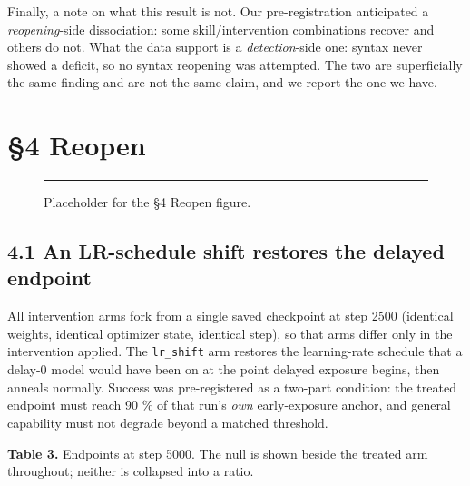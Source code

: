 \documentclass[11pt]{article}
\begin{document}
Finally, a note on what this result is not. Our pre-registration anticipated a
\emph{reopening}-side dissociation: some skill/intervention combinations recover and others do
not. What the data support is a \emph{detection}-side one: syntax never showed a deficit, so no
syntax reopening was attempted. The two are superficially the same finding and are not the
same claim, and we report the one we have.

\section{§4 Reopen}\label{reopen}

\begin{figure}[t]
\centering
\rule{\linewidth}{36.00\baselineskip}
\caption{Placeholder for the §4 Reopen figure.}
\end{figure}

\subsection{4.1 An LR-schedule shift restores the delayed endpoint}\label{an-lr-schedule-shift-restores-the-delayed-endpoint}

All intervention arms fork from a single saved checkpoint at step 2500 (identical weights,
identical optimizer state, identical step), so that arms differ only in the intervention
applied. The \texttt{lr\_shift} arm restores the learning-rate schedule that a delay-0 model would
have been on at the point delayed exposure begins, then anneals normally. Success was
pre-registered as a two-part condition: the treated endpoint must reach 90 \% of that run's
\emph{own} early-exposure anchor, and general capability must not degrade beyond a matched
threshold.

\textbf{Table 3.} Endpoints at step 5000. The null is shown beside the treated arm throughout;
neither is collapsed into a ratio.
\end{document}
